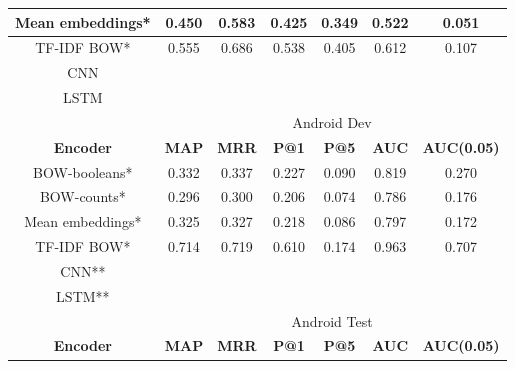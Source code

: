 \documentclass[12pt]{article}
\begin{document}
\begin{center}
\begin{tabular}{|c||c|c|c|c||c|c|}
			\cellcolor{red!15}Mean embeddings* & 0.450 & 0.583 & 0.425 & 0.349 & 0.522 & 0.051 \\ \hline
			\cellcolor{red!15}TF-IDF BOW* & 0.555 & 0.686 & 0.538 & 0.405 & 0.612 & 0.107 \\ \hline\hline
			\cellcolor{green!15}CNN &  &  &  &  &  &  \\ \hline
			\cellcolor{green!15}LSTM &  &  &  &  &  &  \\ \hline
			\hline
			\cellcolor{gray!15}
				& \multicolumn{6}{c|}{\cellcolor{gray!15}Android Dev} \\ \hline
			\cellcolor{gray!15}\textbf{Encoder} & \cellcolor{gray!15}\textbf{MAP} & \cellcolor{gray!15}\textbf{MRR}
				& \cellcolor{gray!15}\textbf{P@1} & \cellcolor{gray!15}\textbf{P@5}
				& \cellcolor{gray!15}\textbf{AUC} & \cellcolor{gray!15}\textbf{AUC(0.05)} \\ \hline\hline
			\cellcolor{red!15}BOW-booleans* & 0.332 & 0.337 & 0.227 & 0.090 & 0.819 & 0.270 \\ \hline
			\cellcolor{red!15}BOW-counts* & 0.296 & 0.300 & 0.206 & 0.074 & 0.786 & 0.176 \\ \hline
			\cellcolor{red!15}Mean embeddings* & 0.325 & 0.327 & 0.218 & 0.086 & 0.797 & 0.172 \\ \hline
			\cellcolor{red!15}TF-IDF BOW* & 0.714 & 0.719 & 0.610 & 0.174 & 0.963 & 0.707 \\ \hline\hline
			\cellcolor{green!15}CNN** &  &  &  &  &  &  \\ \hline
			\cellcolor{green!15}LSTM** &  &  &  &  &  &  \\ \hline
			\hline
			\cellcolor{gray!15}
				& \multicolumn{6}{c|}{\cellcolor{gray!15}Android Test} \\ \hline
			\cellcolor{gray!15}\textbf{Encoder} & \cellcolor{gray!15}\textbf{MAP} & \cellcolor{gray!15}\textbf{MRR}
				& \cellcolor{gray!15}\textbf{P@1} & \cellcolor{gray!15}\textbf{P@5}
				& \cellcolor{gray!15}\textbf{AUC} & \cellcolor{gray!15}\textbf{AUC(0.05)} \\ \hline\hline

\end{tabular}
\end{center}
\end{document}
